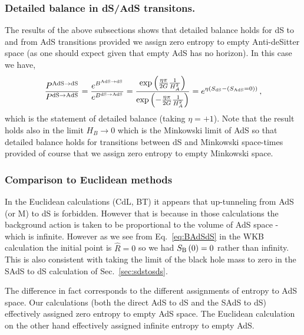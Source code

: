 \documentclass[a4paper,11pt]{article}
\numberwithin{equation}{section}
\numberwithin{equation}{section}
\begin{document}
\subsubsection*{Detailed balance in dS/AdS transitons.}

The results of the above subsections shows that detailed balance holds
for dS to and from AdS transitions provided we assign zero entropy to empty Anti-deSitter space (as one should expect
given that empty AdS has no horizon).  In this case we have,
\begin{equation}
\frac{P^{{\rm AdS \rightarrow dS}}}{P^{{\rm dS \rightarrow AdS}}}=\frac{e^{B^{{\rm AdS \rightarrow dS}}}}{e^{B^{{\rm dS \rightarrow AdS}}}}=\frac{\exp\left(\frac{\eta\pi}{2G}\frac{1}{H_{A}^{2}}\right)}{\exp\left(-\frac{\eta\pi}{2G}\frac{1}{H_{A}^{2}}\right)}=e^{\eta\left(S_{{\rm dS}}-\left(S_{{\rm AdS}}=0\right)\right)} \,,\label{eq:dSAdSdb}
\end{equation}
which is the statement of detailed balance (taking $\eta=+1$).  Note that the
result holds also in the limit $H_{B} \rightarrow 0$ which is the Minkowski
limit of AdS so that detailed balance holds for transitions between
dS and Minkowski space-times provided of course that we assign zero
entropy to empty Minkowski space. 

\subsubsection*{Comparison to Euclidean methods}

In the Euclidean calculations (CdL, BT) it appears that up-tunneling
from AdS (or M) to dS is forbidden. However that is because in those
calculations the background action is taken to be proportional to
the volume of AdS space - which is infinite. However as we see from Eq.~\eqref{eq:BAdSdS} in the WKB calculation the initial point is
$\hat{R}=0$ so we had $S_{{\rm B}}\left(0\right)=0$ rather than
infinity. This is also consistent with taking the limit of the black hole mass to zero in the SAdS to dS calculation of Sec.~\ref{sec:sdstosds}.

The difference in fact corresponds to the different assignments of
entropy to AdS space. Our calculations (both the direct AdS to dS
and the SAdS to dS) effectively assigned zero entropy to empty AdS
space. The Euclidean calculation on the other hand effectively assigned
infinite entropy to empty AdS.

\end{document}
